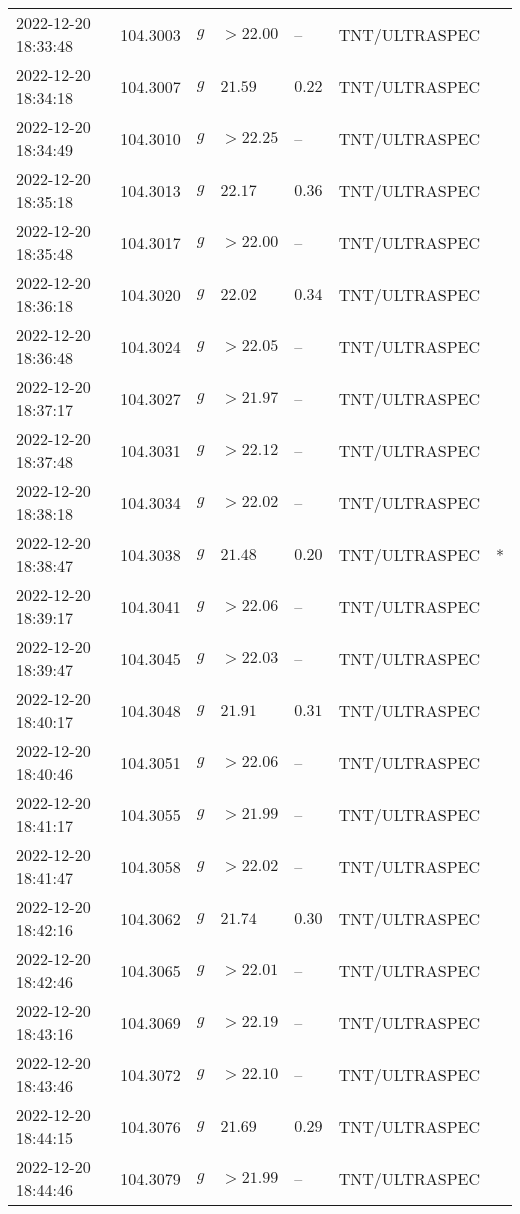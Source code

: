 \documentclass{nature_plusfigure}
\begin{document}
\begin{supplement}
\begin{center}
\begin{longtable}{lllllll}
2022-12-20 18:33:48 & 104.3003 & $g$ & $>22.00$ & -- & TNT/ULTRASPEC &  \\ 
2022-12-20 18:34:18 & 104.3007 & $g$ & $21.59$ & $0.22$ & TNT/ULTRASPEC &  \\ 
2022-12-20 18:34:49 & 104.3010 & $g$ & $>22.25$ & -- & TNT/ULTRASPEC &  \\ 
2022-12-20 18:35:18 & 104.3013 & $g$ & $22.17$ & $0.36$ & TNT/ULTRASPEC &  \\ 
2022-12-20 18:35:48 & 104.3017 & $g$ & $>22.00$ & -- & TNT/ULTRASPEC &  \\ 
2022-12-20 18:36:18 & 104.3020 & $g$ & $22.02$ & $0.34$ & TNT/ULTRASPEC &  \\ 
2022-12-20 18:36:48 & 104.3024 & $g$ & $>22.05$ & -- & TNT/ULTRASPEC &  \\ 
2022-12-20 18:37:17 & 104.3027 & $g$ & $>21.97$ & -- & TNT/ULTRASPEC &  \\ 
2022-12-20 18:37:48 & 104.3031 & $g$ & $>22.12$ & -- & TNT/ULTRASPEC &  \\ 
2022-12-20 18:38:18 & 104.3034 & $g$ & $>22.02$ & -- & TNT/ULTRASPEC &  \\ 
2022-12-20 18:38:47 & 104.3038 & $g$ & $21.48$ & $0.20$ & TNT/ULTRASPEC & * \\ 
2022-12-20 18:39:17 & 104.3041 & $g$ & $>22.06$ & -- & TNT/ULTRASPEC &  \\ 
2022-12-20 18:39:47 & 104.3045 & $g$ & $>22.03$ & -- & TNT/ULTRASPEC &  \\ 
2022-12-20 18:40:17 & 104.3048 & $g$ & $21.91$ & $0.31$ & TNT/ULTRASPEC &  \\ 
2022-12-20 18:40:46 & 104.3051 & $g$ & $>22.06$ & -- & TNT/ULTRASPEC &  \\ 
2022-12-20 18:41:17 & 104.3055 & $g$ & $>21.99$ & -- & TNT/ULTRASPEC &  \\ 
2022-12-20 18:41:47 & 104.3058 & $g$ & $>22.02$ & -- & TNT/ULTRASPEC &  \\ 
2022-12-20 18:42:16 & 104.3062 & $g$ & $21.74$ & $0.30$ & TNT/ULTRASPEC &  \\ 
2022-12-20 18:42:46 & 104.3065 & $g$ & $>22.01$ & -- & TNT/ULTRASPEC &  \\ 
2022-12-20 18:43:16 & 104.3069 & $g$ & $>22.19$ & -- & TNT/ULTRASPEC &  \\ 
2022-12-20 18:43:46 & 104.3072 & $g$ & $>22.10$ & -- & TNT/ULTRASPEC &  \\ 
2022-12-20 18:44:15 & 104.3076 & $g$ & $21.69$ & $0.29$ & TNT/ULTRASPEC &  \\ 
2022-12-20 18:44:46 & 104.3079 & $g$ & $>21.99$ & -- & TNT/ULTRASPEC &  \\ 

\end{longtable}
\end{center}
\end{supplement}
\end{document}
